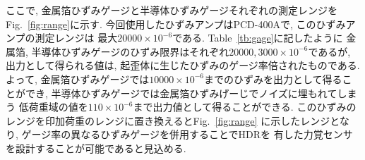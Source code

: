 ここで, 金属箔ひずみゲージと半導体ひずみゲージそれぞれの測定レンジを
Fig.~\ref{fig:range}に示す. 
今回使用したひずみアンプはPCD-400Aで, このひずみアンプの測定レンジは
最大$20000×10^{-6}$である. Table~\ref{tb:gage}に記したように
金属箔, 半導体ひずみゲージのひずみ限界はそれぞれ$20000, 3000×10^{-6}$であるが, 
出力として得られる値は, 起歪体に生じたひずみのゲージ率倍されたものである. 
よって, 金属箔ひずみゲージでは$10000×10^{-6}$までのひずみを出力として得ることができ, 
半導体ひずみゲージでは金属箔ひずみげーじでノイズに埋もれてしまう
低荷重域の値を$110×10^{-6}$まで出力値として得ることができる. 
このひずみのレンジを印加荷重のレンジに置き換えるとFig.~\ref{fig:range}
に示したレンジとなり, ゲージ率の異なるひずみゲージを併用することでHDRを
有した力覚センサを設計することが可能であると見込める. 

